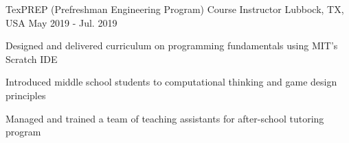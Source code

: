 \begin{cventries}
    \cventry
    {TexPREP (Prefreshman Engineering Program)}
    {Course Instructor}
    {Lubbock, TX, USA}
    {May 2019 - Jul. 2019}
    {
        \begin{cvitems}
        \item{Designed and delivered curriculum on programming fundamentals using MIT's Scratch IDE}
        \item{Introduced middle school students to computational thinking and game design principles}
        \item{Managed and trained a team of teaching assistants for after-school tutoring program}
        \end{cvitems}
        \vspace{1em}
    }
\end{cventries} 